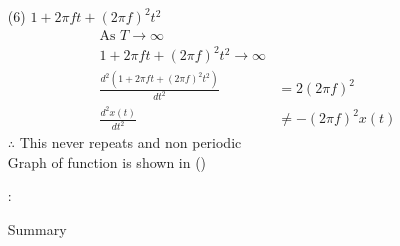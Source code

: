 \documentclass[journal,12pt,onecolumn]{IEEEtran}
\theoremstyle{remark}
\begin{document}
\begin{enumerate}
 \item[(6)] $1+2\pi f t+(2\pi f)^2t^2$\\

 \begin{align}
  \text{As } T\to\infty\\
  1+2\pi f t+(2\pi f)^2t^2  \to \infty\\
   \frac{d^2(1+2\pi f t+(2\pi f)^2t^2)}{dt^2}&=2(2\pi f)^2\\
   \frac{d^2 x(t)}{dt^2} &\neq - (2\pi f)^2 x(t)
 \end{align}
  $\therefore$ This never repeats and non periodic\\ 
 Graph of function is shown in ()
 \begin{flushleft}
  \begin{table}[h]
   \def\arraystretch{1.5}:
   \caption{Summary}
   \label{tab:table.11.14-4}
   
  \end{table}
 \end{flushleft}
 
\end{enumerate}
 \renewcommand{\thefigure}{\theenumi}
 \renewcommand{\thetable}{\theenumi}
 
\end{document}
